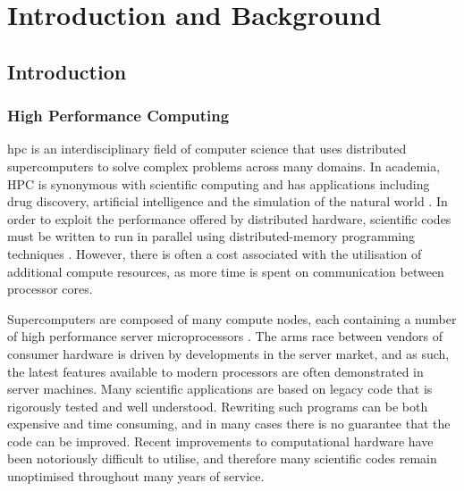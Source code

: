\documentclass[a4paper,11pt]{report}
\begin{document}
\tableofcontents{}
\listoffigures
\listoftables
\printglossary[type=\acronymtype,title=List of Abbreviations]

\cleardoublepage%

\part{Introduction and Background}
\chapter{Introduction}
\label{chap:intro}
\section{High Performance Computing}
\label{sec:sec01}
\gls{hpc} is an interdisciplinary field of computer science that uses distributed supercomputers to solve complex problems across many domains. In academia, HPC is synonymous with scientific computing and has applications including drug discovery, artificial intelligence and the simulation of the natural world \cite{okimoto2009high, jouppi2017datacenter, bretherton2012national}. In order to exploit the performance offered by distributed hardware, scientific codes must be written to run in parallel using distributed-memory programming techniques \cite{asanovic2006landscape}. However, there is often a cost associated with the utilisation of additional compute resources, as more time is spent on communication between processor cores. 
\par
Supercomputers are composed of many compute nodes, each containing a number of high performance server microprocessors \cite{becker1995beowulf}. The arms race between vendors of consumer hardware is driven by developments in the server market, and as such, the latest features available to modern processors are often demonstrated in server machines. Many scientific applications are based on legacy code that is rigorously tested and well understood. Rewriting such programs can be both expensive and time consuming, and in many cases there is no guarantee that the code can be improved. Recent improvements to computational hardware have been notoriously difficult to utilise, and therefore many scientific codes remain unoptimised throughout many years of service.
\end{document}
